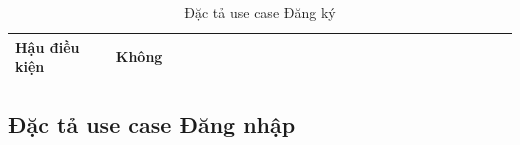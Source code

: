 \documentclass[../DoAn.tex]{subfiles}
\begin{document}
\begin{table}[ht]
\begin{tabular}{| p{0.2\linewidth} | p{0.1\linewidth} | p{0.2\linewidth} | p{0.5\linewidth} |}
        \textbf{Hậu điều kiện}                                       & \multicolumn{3}{p{0.1\linewidth}|}{Không}                                                                                                                                                                                                                                     \\ \hline
    \end{tabular}%
    \renewcommand{\arraystretch}{1}
    \caption{Đặc tả use case Đăng ký}
    \label{tab:UC01}
\end{table}

\newpage

\subsection{Đặc tả use case Đăng nhập}
\label{subsection:2.3.2}
\end{document}

